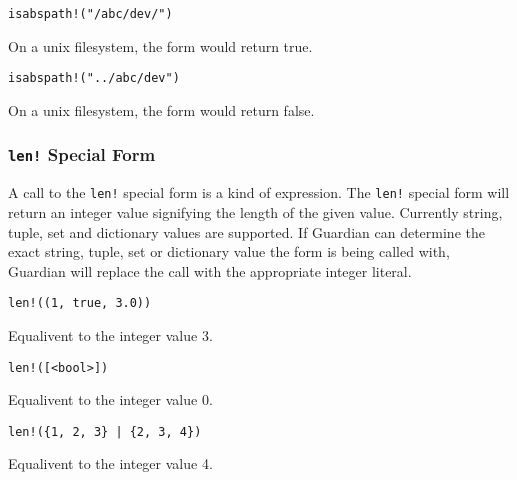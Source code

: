 {{		\begin{itemize}
		{
			\item[] \lstinline[language=MAIA, columns=fixed]@isabspath!("/abc/dev/")@
			
				On a unix filesystem, the form would return true.
			
			\item[] \lstinline[language=MAIA, columns=fixed]@isabspath!("../abc/dev")@
			
				On a unix filesystem, the form would return false.
		}
		\end{itemize}
	}
	
	\subsubsection{\lstinline[language=MAIA, columns=fixed]@len!@ Special Form}
	{
		A call to the \lstinline[language=MAIA, columns=fixed]@len!@ special form is a kind of expression.
		The \lstinline[language=MAIA, columns=fixed]@len!@ special form will return an integer value signifying
		the length of the given value. Currently string, tuple, set
		and dictionary values are supported.
		If Guardian can determine the exact string, tuple, set or dictionary
		value the form is being called with, Guardian will replace the call with
		the appropriate integer literal.
		
		\begin{itemize}
		{
			\item[] \lstinline[language=MAIA, columns=fixed]@len!((1, true, 3.0))@
			
				Equalivent to the integer value 3.
			
			\item[] \lstinline[language=MAIA, columns=fixed]@len!([<bool>])@
			
				Equalivent to the integer value 0.
			
			\item[] \lstinline[language=MAIA, columns=fixed]@len!({1, 2, 3} | {2, 3, 4})@
			
				Equalivent to the integer value 4.
		}
		\end{itemize}
	}
	
}
